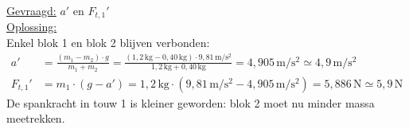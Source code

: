 \documentclass{ximera}
\begin{document}
\begin{exercise}
\begin{question}
        \begin{solution}\nl
            \underline{Gevraagd:} $a'$ en $F_{t,1}'$ \\

            \underline{Oplossing:}\\
            Enkel blok 1 en blok 2 blijven verbonden:
            \begin{align*}
                a' &= \frac{(m_{1} - m_{2}) \cdot g}{m_{1}+m_{2}} = \frac{(1{,}2 \, \mathrm{kg} - 0{,}40 \, \mathrm{kg}) \cdot 9{,}81 \, \mathrm{m/s^2}}{1{,}2 \, \mathrm{kg} + 0{,}40 \, \mathrm{kg}} = 4{,}905 \, \mathrm{m/s^2} \simeq 4{,}9 \, \mathrm{m/s^2} \\
                F_{t,1}' &= m_{1} \cdot (g - a') = 1{,}2 \, \mathrm{kg} \cdot (9{,}81 \, \mathrm{m/s^2} - 4{,}905 \, \mathrm{m/s^2}) = 5{,}886 \, \mathrm{N} \simeq 5{,}9 \, \mathrm{N}
            \end{align*}
            De spankracht in touw 1 is kleiner geworden: blok 2 moet nu minder massa meetrekken.
        \end{solution}
    \end{question}
\end{exercise}
\end{document}
